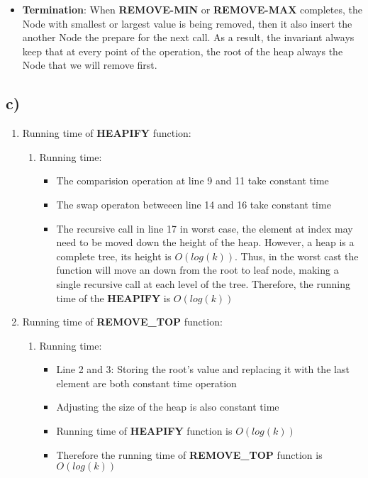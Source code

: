 \documentclass{article}
\begin{document}
\begin{itemize}
\begin{itemize}
			\item \textbf{Termination}: When \textbf{REMOVE-MIN} or \textbf{REMOVE-MAX} completes, the Node with smallest or largest value is being removed, then it also insert the another Node the prepare for the next call. As a result, the invariant always keep that at every point of the operation, the root of the heap always the Node that we will remove first.
		\end{itemize}
	\end{itemize}

	\subsection*{c)}
	\begin{enumerate}
		\item Running time of \textbf{HEAPIFY} function:
		\begin{enumerate}
			\item Running time:
			\begin{itemize}
				\item The comparision operation at line 9 and 11 take constant time
				\item The swap operaton betweeen line 14 and 16 take constant time
				\item The recursive call in line 17 in worst case, the element at index may need to be moved down the height of the heap. However, a heap is a complete tree, its height is \(O(log(k))\). Thus, in the worst cast the function will move an  down from the root to leaf node, making a single recursive call at each level of the tree. Therefore, the running time of the \textbf{HEAPIFY} is \(O(log(k))\)
			\end{itemize}
		\end{enumerate}
		\item Running time of \textbf{REMOVE\_TOP} function:
		\begin{enumerate}
			\item Running time:
			\begin{itemize}
				\item Line 2 and 3: Storing the root's value and replacing it with the last element are both constant time operation
				\item Adjusting the size of the heap is also constant time
				\item Running time of \textbf{HEAPIFY} function is \(O(log(k))\)
				\item Therefore the running time of \textbf{REMOVE\_TOP} function is \(O(log(k))\)

\end{itemize}
\end{enumerate}
\end{enumerate}
\end{document}
